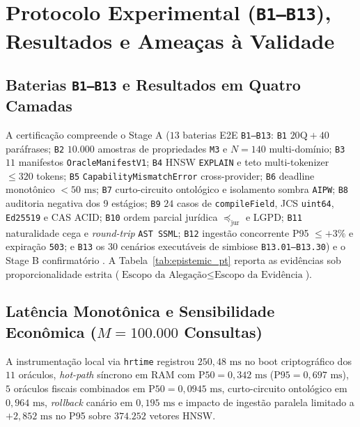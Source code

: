 \documentclass[10pt,twocolumn]{article}
\begin{document}
\section{Protocolo Experimental (\texttt{B1--B13}), Resultados e Amea\c{c}as \`a Validade}

\subsection{Baterias \texttt{B1--B13} e Resultados em Quatro Camadas}

A certifica\c{c}\~ao compreende o Stage A ($13$ baterias E2E \texttt{B1--B13}: \texttt{B1} $20\text{Q}+40$ par\'afrases; \texttt{B2} $10.000$ amostras de propriedades \texttt{M3} e $N=140$ multi-dom\'inio; \texttt{B3} $11$ manifestos \texttt{OracleManifestV1}; \texttt{B4} HNSW \texttt{EXPLAIN} e teto multi-tokenizer $\le 320$ tokens; \texttt{B5} \texttt{CapabilityMismatchError} cross-provider; \texttt{B6} deadline monot\^onico $<50\text{ ms}$; \texttt{B7} curto-circuito ontol\'ogico e isolamento sombra \texttt{AIPW}; \texttt{B8} auditoria negativa dos 9 est\'agios; \texttt{B9} $24$ casos de \texttt{compileField}, JCS \texttt{uint64}, \texttt{Ed25519} e CAS ACID; \texttt{B10} ordem parcial jur\'idica $\preceq_{\mathrm{jur}}$ e LGPD; \texttt{B11} naturalidade cega e \emph{round-trip} \texttt{AST SSML}; \texttt{B12} ingest\~ao concorrente P95 $\le +3\%$ e expira\c{c}\~ao \texttt{503}; e \texttt{B13} os $30$ cen\'arios execut\'aveis de simbiose \texttt{B13.01--B13.30}) e o Stage B confirmat\'orio \cite{howard2021time}. A Tabela~\ref{tab:epistemic_pt} reporta as evid\^encias sob proporcionalidade estrita ($\text{Escopo da Alega\c{c}\~ao} \le \text{Escopo da Evid\^encia}$).

\subsection{Lat\^encia Monot\^onica e Sensibilidade Econ\^omica ($M = 100.000$ Consultas)}

A instrumenta\c{c}\~ao local via \texttt{hrtime} registrou $250,48\text{ ms}$ no boot criptogr\'afico dos $11$ or\'aculos, \emph{hot-path} s\'incrono em RAM com $\mathrm{P50}=0,342\text{ ms}$ ($\mathrm{P95}=0,697\text{ ms}$), $5$ or\'aculos fiscais combinados em $\mathrm{P50}=0,0945\text{ ms}$, curto-circuito ontol\'ogico em $0,964\text{ ms}$, \emph{rollback} can\'ario em $0,195\text{ ms}$ e impacto de ingest\~ao paralela limitado a $+2,852\text{ ms}$ no P95 sobre $374.252$ vetores HNSW.
\end{document}
